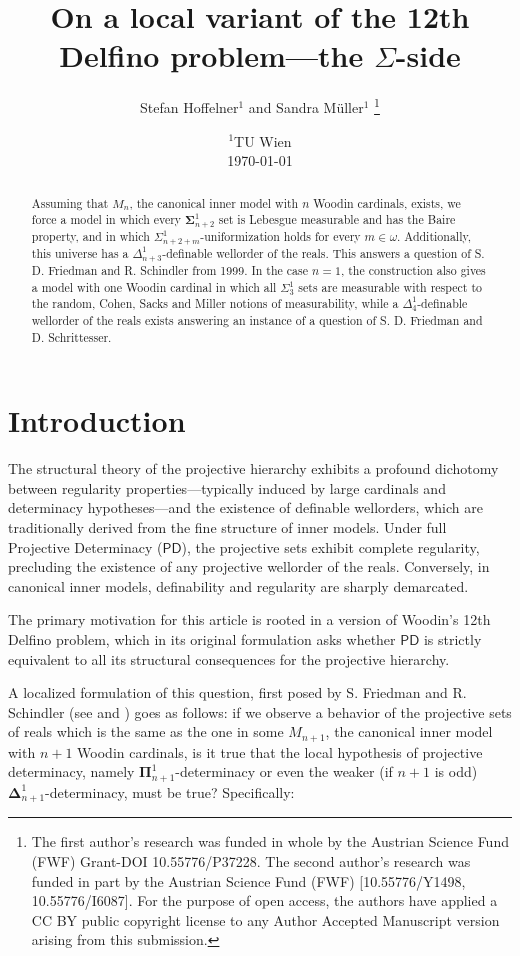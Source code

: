 \documentclass[a4paper,11pt]{article}
\title{On a local variant of the 12th Delfino problem---the $\Sigma$-side}
\author{ Stefan Hoffelner$^{1}$ and Sandra M\"uller$^{1}$ \footnote{The first author's research was funded in whole by the Austrian Science Fund (FWF) Grant-DOI 10.55776/P37228. The second author's research was funded in part by the Austrian Science Fund (FWF) [10.55776/Y1498, 10.55776/I6087]. For the purpose of open access, the authors have applied a CC BY public copyright license to any Author Accepted Manuscript version arising from this submission. }  }
\date{
    $^1$TU Wien \\
    \today
}
\begin{document}
\maketitle
\begin{abstract}
Assuming that $M_n$, the canonical inner model with $n$ Woodin cardinals,
exists, we force a model in which every $\boldsymbol{\Sigma}^1_{n+2}$ set is
Lebesgue measurable and has the Baire property, and in which
$\Sigma^1_{n+2+m}$-uniformization holds for every $m\in\omega$. Additionally,
this universe has a $\Delta^1_{n+3}$-definable wellorder of the reals. This
answers a question of S. D. Friedman and R. Schindler from
1999. In the case $n=1$, the construction also gives a model with one Woodin
cardinal in which all $\Sigma^1_3$ sets are measurable with respect to the
random, Cohen, Sacks and Miller notions of measurability, while a
$\Delta^1_4$-definable wellorder of the reals exists answering an instance of a question of S. D. Friedman and D. Schrittesser.
\end{abstract}
\section{Introduction}

The structural theory of the projective hierarchy exhibits a profound dichotomy between regularity properties---typically induced by large cardinals and determinacy hypotheses---and the existence of definable wellorders, which are traditionally derived from the fine structure of inner models. Under full Projective Determinacy ($\mathsf{PD}$), the projective sets exhibit complete regularity, precluding the existence of any projective wellorder of the reals. Conversely, in canonical inner models, definability and regularity are sharply demarcated. 

The primary motivation for this article is rooted in a version of Woodin's 12th Delfino problem, which in its original formulation asks whether $\mathsf{PD}$ is strictly equivalent to all its structural consequences for the projective hierarchy. 

A localized formulation of this question, first posed by S. Friedman and R. Schindler (see \cite{friedman2003universally} and \cite{schindler_delfino}) goes as follows: if we observe a behavior of the projective sets of reals which is the same as the one in some $M_{n+1}$, the canonical inner model with $n+1$ Woodin cardinals, is it true that the local hypothesis of projective determinacy, namely $\boldsymbol{\Pi}^1_{n+1}$-determinacy or even the weaker (if $n+1$ is odd) $\boldsymbol{\Delta}^1_{n+1}$-determinacy, must be true? Specifically:
\end{document}
